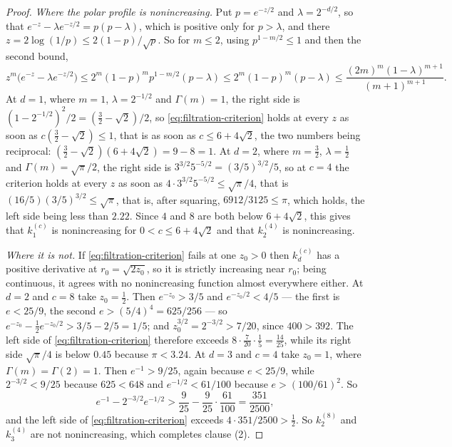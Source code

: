 \begin{proof}
\emph{Where the polar profile is nonincreasing.} Put $p = e^{-z/2}$ and $\lambda = 2^{-d/2}$, so
that $e^{-z} - \lambda e^{-z/2} = p(p-\lambda)$, which is positive only for $p > \lambda$, and
there $z = 2\log(1/p) \le 2(1-p)/\sqrt p$. So for $m \le 2$, using $p^{1-m/2} \le 1$ and then the
second bound,
\[
  z^m\bigl(e^{-z} - \lambda e^{-z/2}\bigr) \le 2^m(1-p)^m p^{1-m/2}(p-\lambda)
   \le 2^m(1-p)^m(p-\lambda) \le \frac{(2m)^m(1-\lambda)^{m+1}}{(m+1)^{m+1}} .
\]
At $d = 1$, where $m = 1$, $\lambda = 2^{-1/2}$ and $\Gamma(m) = 1$, the right side is
$(1-2^{-1/2})^2/2 = (\tfrac32-\sqrt2)/2$, so \ref{eq:filtration-criterion} holds at every $z$ as
soon as $c(\tfrac32-\sqrt2) \le 1$, that is as soon as $c \le 6 + 4\sqrt2$, the two numbers being
reciprocal: $(\tfrac32-\sqrt2)(6+4\sqrt2) = 9 - 8 = 1$. At $d = 2$, where $m = \tfrac32$,
$\lambda = \tfrac12$ and $\Gamma(m) = \sqrt\pi/2$, the right side is
$3^{3/2}5^{-5/2} = (3/5)^{3/2}/5$, so at $c = 4$ the criterion holds at every $z$ as soon as
$4\cdot 3^{3/2}5^{-5/2} \le \sqrt\pi/4$, that is $(16/5)(3/5)^{3/2} \le \sqrt\pi$, that is, after
squaring, $6912/3125 \le \pi$, which holds, the left side being less than $2.22$. Since $4$ and
$8$ are both below $6+4\sqrt2$, this gives that $k^{(c)}_1$ is nonincreasing for
$0 < c \le 6+4\sqrt2$ and that $k^{(4)}_2$ is nonincreasing.

\emph{Where it is not.} If \ref{eq:filtration-criterion} fails at one $z_0 > 0$ then $k^{(c)}_d$
has a positive derivative at $r_0 = \sqrt{2z_0}$, so it is strictly increasing near $r_0$; being
continuous, it agrees with no nonincreasing function almost everywhere either. At $d = 2$ and
$c = 8$ take $z_0 = \tfrac12$. Then $e^{-z_0} > 3/5$ and $e^{-z_0/2} < 4/5$ --- the first is
$e < 25/9$, the second $e > (5/4)^4 = 625/256$ --- so
$e^{-z_0} - \tfrac12 e^{-z_0/2} > 3/5 - 2/5 = 1/5$; and $z_0^{3/2} = 2^{-3/2} > 7/20$, since
$400 > 392$. The left side of \ref{eq:filtration-criterion} therefore exceeds
$8 \cdot \tfrac7{20} \cdot \tfrac15 = \tfrac{14}{25}$, while its right side $\sqrt\pi/4$ is below
$0.45$ because $\pi < 3.24$. At $d = 3$ and $c = 4$ take $z_0 = 1$, where
$\Gamma(m) = \Gamma(2) = 1$. Then $e^{-1} > 9/25$, again because $e < 25/9$, while
$2^{-3/2} < 9/25$ because $625 < 648$ and $e^{-1/2} < 61/100$ because $e > (100/61)^2$. So
\[
  e^{-1} - 2^{-3/2}e^{-1/2} > \frac9{25} - \frac9{25}\cdot\frac{61}{100} = \frac{351}{2500} ,
\]
and the left side of \ref{eq:filtration-criterion} exceeds $4\cdot 351/2500 > \tfrac12$. So
$k^{(8)}_2$ and $k^{(4)}_3$ are not nonincreasing, which completes clause (2).


\end{proof}
